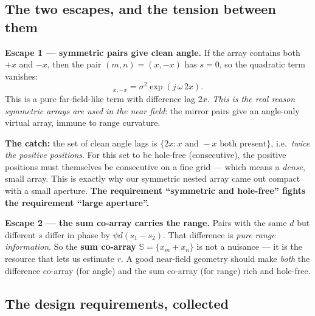 \documentclass[11pt]{article}
\begin{document}
\subsection{The two escapes, and the tension between them}

\textbf{Escape 1 --- symmetric pairs give clean angle.} If the array contains both $+x$ and $-x$,
then the pair $(m,n)=(x,-x)$ has $s=0$, so the quadratic term vanishes:
\begin{equation}
[\mathbf{R}]_{x,-x}=\sigma^2\exp(j\,\omega\,2x).
\end{equation}
This is a pure far-field-like term with difference lag $2x$. \emph{This is the real reason symmetric
arrays are used in the near field}: the mirror pairs give an angle-only virtual array, immune to
range curvature.

\textbf{The catch:} the set of clean angle lags is $\{2x : x \text{ and } -x \text{ both present}\}$,
i.e.\ \emph{twice the positive positions}. For this set to be hole-free (consecutive), the positive
positions must themselves be consecutive on a fine grid --- which means a \emph{dense}, small array.
This is exactly why our symmetric nested array came out compact with a small aperture. \textbf{The
requirement ``symmetric and hole-free'' fights the requirement ``large aperture''.}

\textbf{Escape 2 --- the sum co-array carries the range.} Pairs with the same $d$ but different $s$
differ in phase by $\psi d (s_1-s_2)$. That difference is \emph{pure range information}. So the
\textbf{sum co-array} $\mathbb{S}=\{x_m+x_n\}$ is not a nuisance --- it is the resource that lets us
estimate $r$. A good near-field geometry should make \emph{both} the difference co-array (for angle)
and the sum co-array (for range) rich and hole-free.

\subsection{The design requirements, collected}
\end{document}
